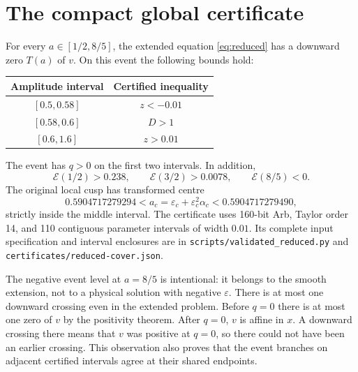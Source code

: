 \documentclass[11pt,a4paper]{report}
\begin{document}
\clearpage
\section{The compact global certificate}
\begin{lemma}\label{lem:cover}
For every $a\in[1/2,8/5]$, the extended equation \eqref{eq:reduced} has a
downward zero $T(a)$ of $v$. On this event the following bounds hold:
\begin{center}
\begin{tabular}{cc}
Amplitude interval & Certified inequality\\\hline
$[0.5,0.58]$ & $z<-0.01$\\
$[0.58,0.6]$ & $D>1$\\
$[0.6,1.6]$ & $z>0.01$
\end{tabular}
\end{center}
The event has $q>0$ on the first two intervals. In addition,
\begin{equation}\label{eq:levels}
 \mathcal E(1/2)>0.238,\qquad
 \mathcal E(3/2)>0.0078,\qquad \mathcal E(8/5)<0.
\end{equation}
The original local cusp has transformed centre
\[
 0.5904717279294<a_c=\varepsilon_c+\varepsilon_c^2\alpha_c
 <0.5904717279490,
\]
strictly inside the middle interval. The certificate uses 160-bit Arb,
Taylor order 14, and 110 contiguous parameter intervals of width $0.01$.
Its complete input specification and interval enclosures are in
\texttt{scripts/validated\_reduced.py} and
\texttt{certificates/reduced-cover.json}.
\end{lemma}

The negative event level at $a=8/5$ is intentional: it belongs to the smooth
extension, not to a physical solution with negative $\varepsilon$.
There is at most one downward crossing even in the extended problem.
Before $q=0$ there is at most one zero of $v$ by the positivity theorem.
After $q=0$, $v$ is affine in $x$. A downward crossing there means that $v$
was positive at $q=0$, so there could not have been an earlier crossing.
This observation also proves that the event branches on adjacent certified
intervals agree at their shared endpoints.
\end{document}
